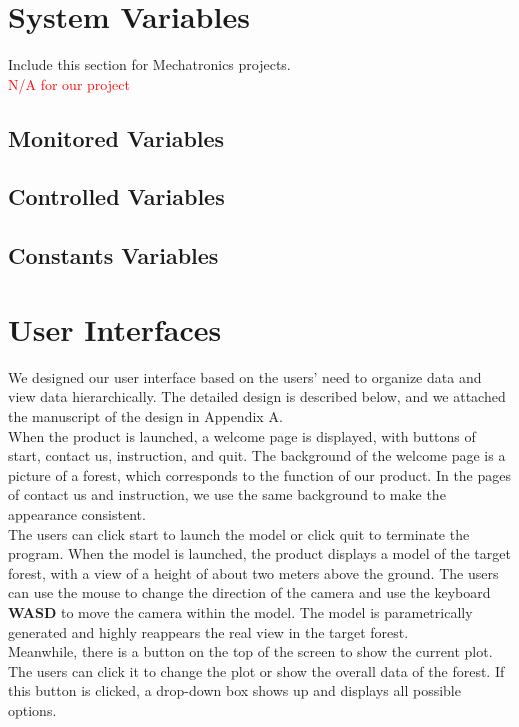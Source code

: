 \documentclass[12pt, titlepage]{article}
\begin{document}
\section{System Variables}

Include this section for Mechatronics projects.\\ \textcolor{red}{N/A for our project}

\subsection{Monitored Variables}

\subsection{Controlled Variables}

\subsection{Constants Variables}

\section{User Interfaces}
We designed our user interface based on the users' need to organize data and view data
hierarchically. The detailed design is described below, and we attached the manuscript of the
design in Appendix A.\\

\noindent When the product is launched, a welcome page is displayed, with buttons of start,
contact us, instruction, and quit. The background of the welcome page is a picture of a
forest, which corresponds to the function of our product. In the pages of contact us and
instruction, we use the same background to make the appearance consistent. \\

\noindent The users can click start to launch the model or click quit to terminate the
program. When the model is launched, the product displays a model of the target forest, with a
view of a height of about two meters above the ground. The users can use the mouse to change
the direction of the camera and use the keyboard \textbf{WASD} to move the camera within the
model. The model is parametrically generated and highly reappears the real view in the target
forest. \\

\noindent Meanwhile, there is a button on the top of the screen to show the current plot. The
users can click it to change the plot or show the overall data of the forest. If this button
is clicked, a drop-down box shows up and displays all possible options. \\
\end{document}
